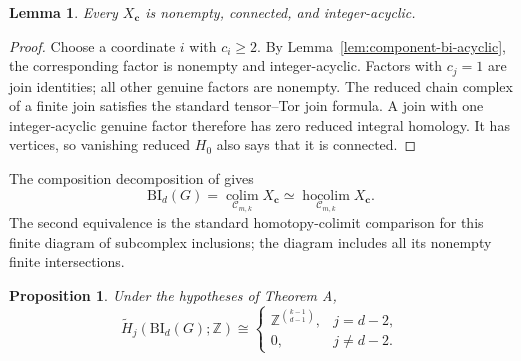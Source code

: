 \documentclass[11pt]{article}
\newtheorem{lemma}[theorem]{Lemma}
\newtheorem{proposition}[theorem]{Proposition}
\theoremstyle{remark}
\numberwithin{equation}{section}
\begin{document}
\begin{lemma}\label{lem:diagram-objects}
Every $X_{\mathbf c}$ is nonempty, connected, and integer-acyclic.
\end{lemma}

\begin{proof}
Choose a coordinate $i$ with $c_i\geq2$. By
Lemma~\ref{lem:component-bi-acyclic}, the corresponding factor is nonempty and
integer-acyclic. Factors with $c_j=1$ are join identities; all other genuine
factors are nonempty. The reduced chain complex of a finite join satisfies the
standard tensor--Tor join formula. A join with one integer-acyclic genuine
factor therefore has zero reduced integral homology. It has vertices, so
vanishing reduced $H_0$ also says that it is connected.
\end{proof}

The composition decomposition of \cite[Lemma 25 and Corollary 27]{ref2} gives
\begin{equation}
\mathrm{BI}_d(G)
=\operatorname*{colim}_{\mathcal C_{m,k}}X_{\mathbf c}
\simeq
\operatorname*{hocolim}_{\mathcal C_{m,k}}X_{\mathbf c}.
\label{eq:hocolim-model}
\end{equation}
The second equivalence is the standard homotopy-colimit comparison for this
finite diagram of subcomplex inclusions; the diagram includes all its
nonempty finite intersections.

\begin{proposition}\label{prop:bi-homology}
Under the hypotheses of Theorem A,
\begin{equation}
\widetilde H_j(\mathrm{BI}_d(G);\mathbb Z)
\cong
\begin{cases}
\mathbb Z^{\binom{k-1}{d-1}},&j=d-2,\\
0,&j\neq d-2.
\end{cases}
\label{eq:bi-homology}
\end{equation}
\end{proposition}
\end{document}
